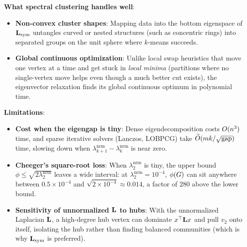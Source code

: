 \begin{focusbox}
\textbf{What spectral clustering handles well}:
\begin{itemize}
  \item \textbf{Non-convex cluster shapes}: Mapping data into the bottom eigenspace of $\mathbf{L}_{\mathrm{sym}}$ untangles curved or nested structures (such as concentric rings) into separated groups on the unit sphere where $k$-means succeeds.
  \item \textbf{Global continuous optimization}: Unlike local swap heuristics that move one vertex at a time and get stuck in \emph{local minima} (partitions where no single-vertex move helps even though a much better cut exists), the eigenvector relaxation finds its global continuous optimum in polynomial time.
\end{itemize}

\textbf{Limitations}:
\begin{itemize}
  \item \textbf{Cost when the eigengap is tiny}: Dense eigendecomposition costs $O(n^3)$ time, and sparse iterative solvers (Lanczos, LOBPCG) take $\widetilde{O}(mk/\sqrt{\mathrm{gap}})$ time, slowing down when $\lambda_{k+1}^{\mathrm{nrm}} - \lambda_k^{\mathrm{nrm}}$ is near zero.
  \item \textbf{Cheeger's square-root loss}: When $\lambda_2^{\mathrm{nrm}}$ is tiny, the upper bound $\phi \le \sqrt{2\lambda_2^{\mathrm{nrm}}}$ leaves a wide interval: at $\lambda_2^{\mathrm{nrm}} = 10^{-4}$, $\phi(G)$ can sit anywhere between $0.5\times 10^{-4}$ and $\sqrt{2\times 10^{-4}} \approx 0.014$, a factor of $280$ above the lower bound.
  \item \textbf{Sensitivity of unnormalized $\mathbf{L}$ to hubs}: With the unnormalized Laplacian $\mathbf{L}$, a high-degree hub vertex can dominate $x^\top \mathbf{L} x$ and pull $v_2$ onto itself, isolating the hub rather than finding balanced communities (which is why $\mathbf{L}_{\mathrm{sym}}$ is preferred).
\end{itemize}
\end{focusbox}

